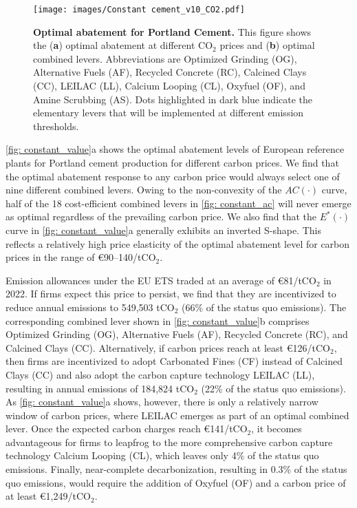\documentclass[12pt, a4paper]{article} %
\begin{document}
\begin{figure}[ht]
\centering
\texttt{[image: images/Constant cement\_v10\_CO2.pdf]}
\caption{\textbf{Optimal abatement for Portland Cement.} This figure shows the (\textbf{a}) optimal abatement at different CO$_2$ prices and (\textbf{b}) optimal combined levers. Abbreviations are Optimized Grinding (OG), Alternative Fuels (AF), Recycled Concrete (RC), Calcined Clays (CC), LEILAC (LL), Calcium Looping (CL), Oxyfuel (OF), and Amine Scrubbing (AS). Dots highlighted in dark blue indicate the elementary levers that will be implemented at different emission thresholds.}
\label{fig: constant_value}
\end{figure}

\autoref{fig: constant_value}a shows the optimal abatement levels of European reference plants for Portland cement production for different carbon prices. We find that the optimal abatement response to any carbon price would always select one of nine different combined levers. Owing to the non-convexity of the $AC(\cdot)$ curve, half of the 18 cost-efficient combined levers in \autoref{fig: constant_ac} will never emerge as optimal regardless of the prevailing carbon price. We also find that the $E^*(\cdot)$ curve in \autoref{fig: constant_value}a generally exhibits an inverted S-shape. This reflects a relatively high price elasticity of the optimal abatement level for carbon prices in the range of \euro 90--140/tCO$_2$.

Emission allowances under the EU ETS traded at an average of \euro 81/tCO$_2$ in 2022. If firms expect this price to persist, we find that they are incentivized to reduce annual emissions to 549,503 tCO$_2$ (66\% of the status quo emissions). The corresponding combined lever shown in \autoref{fig: constant_value}b comprises Optimized Grinding (OG), Alternative Fuels (AF), Recycled Concrete (RC), and Calcined Clays (CC). Alternatively, if carbon prices reach at least \euro 126/tCO$_2$, then firms are incentivized to adopt Carbonated Fines (CF) instead of Calcined Clays (CC) and also adopt the carbon capture technology LEILAC (LL), resulting in annual emissions of 184,824 tCO$_2$ (22\% of the status quo emissions). As \autoref{fig: constant_value}a shows, however, there is only a relatively narrow window of carbon prices, where LEILAC emerges as part of an optimal combined lever. Once the expected carbon charges reach \euro 141/tCO$_2$, it becomes advantageous for firms to leapfrog to the more comprehensive carbon capture technology Calcium Looping (CL), which leaves only 4\% of the status quo emissions. Finally, near-complete decarbonization, resulting in 0.3\% of the status quo emissions, would require the addition of Oxyfuel (OF) and a carbon price of at least \euro 1,249/tCO$_2$.
\end{document}
